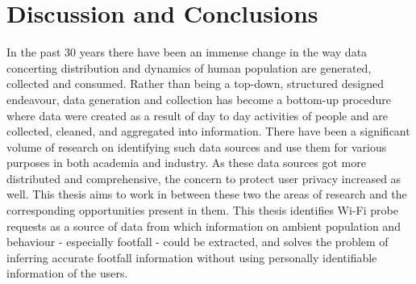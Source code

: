 \chapter{Discussion and Conclusions}
In the past 30 years there have been an immense change in the way data concerting distribution and dynamics of human population are generated, collected and consumed.
Rather than being a top-down, structured designed endeavour, data generation and collection has become a bottom-up procedure where data were created as a result of day to day activities of people and are collected, cleaned, and  aggregated into information.
There have been a significant volume of research on identifying such data sources and use them for various purposes in both academia and industry.
As these data sources got more distributed and comprehensive, the concern to protect user privacy increased as well.
This thesis aims to work in between these two the areas of research and the corresponding opportunities present in them.
This thesis identifies Wi-Fi probe requests as a source of data from which information on ambient population and behaviour - especially footfall - could be extracted, and solves the problem of inferring accurate footfall information without using personally identifiable information of the users.

